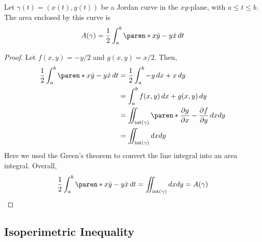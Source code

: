 \documentclass[11pt]{penrose}
\renewcommand{\interior}[1]{\mathrm{int}(#1)}
\begin{document}
\begin{nthm}
    Let $\gamma(t) = (x(t), y(t))$ be a Jordan curve in the $xy$-plane, with $a \leq t \leq b$. The area enclosed by this curve is
    \begin{equation}
        A(\gamma) = \frac{1}{2} \int_a^b \paren*{x\dot{y} - y\dot{x}} \,dt
    \end{equation}
\end{nthm}
\begin{proof}
    Let $f(x,y) = -y/2$ and $g(x,y) = x/2$. Then,
    \begin{align}
        \frac{1}{2} \int_a^b \paren*{x\dot{y} - y\dot{x}} \,dt
        &= \frac{1}{2} \int_a^b  -y \,dx + x \,dy\\
        &= \int_a^b  f(x,y) \,dx + g(x,y) \,dy\\
        &= \iint_{\interior{\gamma}} \paren*{ \frac{\pd g}{\pd x} - \frac{\pd f}{\pd y} } \,dxdy\\
        &= \iint_{\interior{\gamma}} dxdy
    \end{align}
    Here we used the Green's theorem to convert the line integral into an area integral. Overall,
    \begin{equation}
        \frac{1}{2} \int_a^b \paren*{x\dot{y} - y\dot{x}} \,dt = \iint_{\interior{\gamma}} dxdy = A(\gamma)
        \qedhere 
    \end{equation}
\end{proof}

\subsection{Isoperimetric Inequality}
\end{document}
